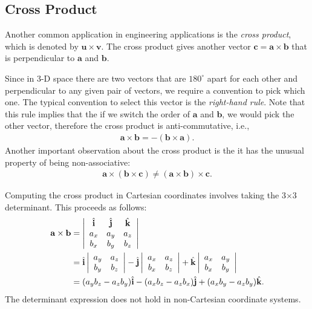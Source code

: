 \subsection{Cross Product} \label{Sec:linearAlgebra_Vectors_CrossProduct}

Another common application in engineering applications is the \emph{cross product}, which is denoted by $\mathbf{u} \times \mathbf{v}$. The cross product gives another vector $\mathbf{c} = \mathbf{a} \times \mathbf{b}$ that is perpendicular to $\mathbf{a}$ and $\mathbf{b}$. 

Since in 3-D space there are two vectors that are $180^\circ$ apart for each other and perpendicular to any given pair of vectors, we require a convention to pick which one. The typical convention to select this vector is the \emph{right-hand rule}. Note that this rule implies that the if we switch the order of $\mathbf{a}$ and $\mathbf{b}$, we would pick the other vector, therefore the cross product is anti-commutative, i.e.,
\begin{align}
  \mathbf{a} \times \mathbf{b} = - ( \mathbf{b} \times \mathbf{a} ).
\end{align}
Another important observation about the cross product is the it has the unusual property of being non-associative:
\begin{align}
  \mathbf{a} \times ( \mathbf{b} \times \mathbf{c} ) \ne ( \mathbf{a} \times  \mathbf{b} ) \times \mathbf{c} .
\end{align}

Computing the cross product in Cartesian coordinates involves taking the 3$\times$3 determinant. This proceeds as follows:
\begin{align}
  \mathbf{a} \times \mathbf{b} 
  &= \left| \begin{array}{c c c} \hat{\mathbf{i}} & \hat{\mathbf{j}} & \hat{\mathbf{k}} \\ a_x & a_y & a_z \\ b_x & b_y & b_z \end{array} \right|  \nonumber \\*
  &= \hat{\mathbf{i}} \left| \begin{array}{c c} a_y & a_z \\ b_y & b_z \end{array} \right|
   - \hat{\mathbf{j}} \left| \begin{array}{c c} a_x & a_z \\ b_x & b_z \end{array} \right|
   + \hat{\mathbf{k}} \left| \begin{array}{c c} a_x & a_y \\ b_x & b_y \end{array} \right| \nonumber \\*
  &= ( a_y b_z - a_z b_y ) \hat{\mathbf{i}} - ( a_x b_z - a_z b_x ) \hat{\mathbf{j}} + ( a_x b_y - a_z b_y ) \hat{\mathbf{k}} .
\end{align}
The determinant expression does not hold in non-Cartesian coordinate systems.

